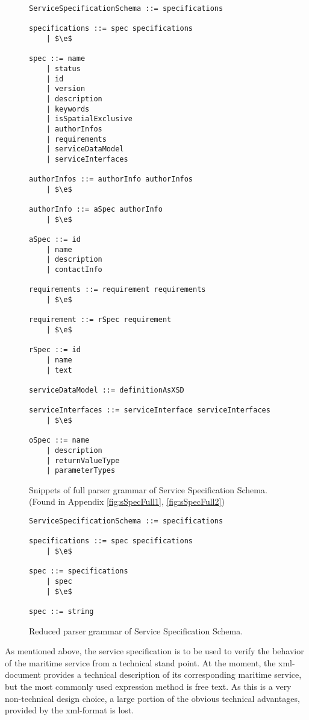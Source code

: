 \begin{figure}
	\centering
	\begin{lstlisting}[keywordstyle={}]
ServiceSpecificationSchema ::= specifications

specifications ::= spec specifications
    | $\e$
     
spec ::= name
    | status
    | id
    | version
    | description
    | keywords
    | isSpatialExclusive
    | authorInfos
    | requirements
    | serviceDataModel
    | serviceInterfaces
     
authorInfos ::= authorInfo authorInfos
    | $\e$

authorInfo ::= aSpec authorInfo
    | $\e$

aSpec ::= id
    | name
    | description
    | contactInfo

requirements ::= requirement requirements
    | $\e$

requirement ::= rSpec requirement
    | $\e$

rSpec ::= id
    | name
    | text

serviceDataModel ::= definitionAsXSD

serviceInterfaces ::= serviceInterface serviceInterfaces
    | $\e$

oSpec ::= name
    | description
    | returnValueType
    | parameterTypes
	\end{lstlisting}
	\caption{Snippets of full parser grammar of Service Specification Schema. (Found in Appendix \ref{fig:sSpecFull1}, \ref{fig:sSpecFull2})}
	\label{fig:sSpecFull}
\end{figure}

\begin{figure}
	\centering
	\begin{lstlisting}[keywordstyle={}]
ServiceSpecificationSchema ::= specifications

specifications ::= spec specifications
    | $\e$
     
spec ::= specifications
    | spec
    | $\e$

spec ::= string
	\end{lstlisting}
	\caption{Reduced parser grammar of Service Specification Schema.}
	\label{fig:sSpecRed}
\end{figure}

As mentioned above, the service specification is to be used to verify the behavior of the maritime service from a technical stand point. At the moment, the xml-document provides a technical description of its corresponding maritime service, but the most commonly used expression method is free text. As this is a very non-technical design choice, a large portion of the obvious technical advantages, provided by the xml-format is lost. 

